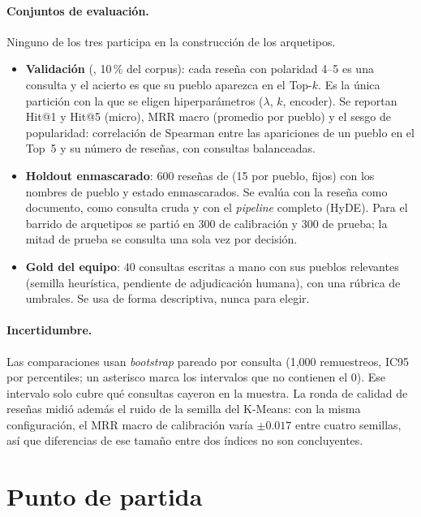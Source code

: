 \documentclass[11pt,a4paper]{article}
\newcommand{\cod}[1]{\texttt{\detokenize{#1}}}
\begin{document}
\paragraph{Conjuntos de evaluación.} Ninguno de los tres participa en la construcción de los arquetipos.
\begin{itemize}
  \item \textbf{Validación} (\cod{val}, 10\,\% del corpus): cada reseña con polaridad 4--5 es una
        consulta y el acierto es que su pueblo aparezca en el Top-$k$. Es la única partición con la
        que se eligen hiperparámetros ($\lambda$, $k$, encoder). Se reportan Hit@1 y Hit@5 (micro), MRR
        macro (promedio por pueblo) y el sesgo de popularidad: correlación de Spearman entre las
        apariciones de un pueblo en el Top~5 y su número de reseñas, con consultas balanceadas.
  \item \textbf{Holdout enmascarado}: 600 reseñas de \cod{val} (15 por pueblo, \cod{row_id} fijos) con
        los nombres de pueblo y estado enmascarados. Se evalúa con la reseña como documento, como
        consulta cruda y con el \emph{pipeline} completo (HyDE). Para el barrido de arquetipos se partió en
        300 de calibración y 300 de prueba; la mitad de prueba se consulta una sola vez por decisión.
  \item \textbf{Gold del equipo}: 40 consultas escritas a mano con sus pueblos relevantes (semilla
        heurística, pendiente de adjudicación humana), con una rúbrica de umbrales. Se usa de forma
        descriptiva, nunca para elegir.
\end{itemize}

\paragraph{Incertidumbre.} Las comparaciones usan \emph{bootstrap} pareado por consulta (1,000
remuestreos, IC95 por percentiles; un asterisco marca los intervalos que no contienen el 0). Ese
intervalo solo cubre qué consultas cayeron en la muestra. La ronda de calidad de reseñas midió
además el ruido de la semilla del K-Means: con la misma configuración, el MRR macro de calibración
varía $\pm 0.017$ entre cuatro semillas, así que diferencias de ese tamaño entre dos índices no
son concluyentes.

\section{Punto de partida}
\end{document}
